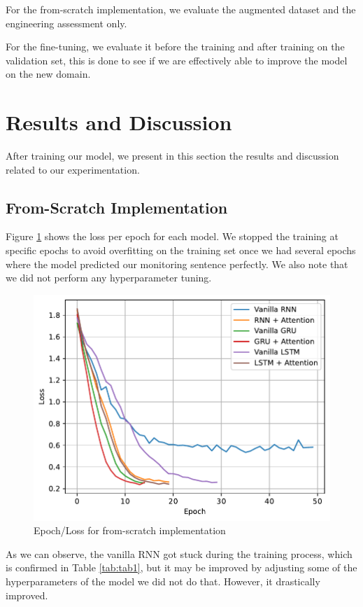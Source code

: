For the from-scratch implementation, we evaluate the augmented dataset and the engineering assessment only.

For the fine-tuning, we evaluate it before the training and after training on the validation set, this is done to see if we are effectively able to improve the model on the new domain.


\section{Results and Discussion}\label{res}
After training our model, we present in this section the results and discussion related to our experimentation.

\subsection{From-Scratch Implementation}
Figure \ref{fig:loss1} shows the loss per epoch for each model. We stopped the training at specific epochs to avoid overfitting on the training set once we had several epochs where the model predicted our monitoring sentence perfectly. We also note that we did not perform any hyperparameter tuning.

\begin{figure}[H]
	\centering
	\includegraphics[width=0.9\linewidth]{./figures/vanilla.pdf}
	\caption{Epoch/Loss for from-scratch implementation}
	\label{fig:loss1}
\end{figure}

As we can observe, the vanilla RNN got stuck during the training process, which is confirmed in Table \ref{tab:tab1}, but it may be improved by adjusting some of the hyperparameters of the model we did not do that. However, it drastically improved.


